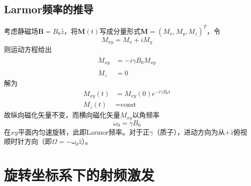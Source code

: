 \documentclass[12pt]{article}
\begin{document}
\subsection{Larmor频率的推导}\label{chap:larmor_freq}
考虑静磁场$\bm{B}=B_0\hat{z}$，将$\bm{M}(t)$写成分量形式$\bm{M}=(M_x,M_y,M_z)^T$，令
\begin{equation}
    M_{xy}=M_x+iM_y
    \label{equ:Mxy_def}
\end{equation}
则运动方程给出
\begin{align}
    \dot{M}_{xy}&=-i\gamma B_0M_{xy} \label{equ:Mxy_equ}\\
    \dot{M}_z&=0
\end{align}
解为
\begin{align}
    M_{xy}(t)&=M_{xy}(0)e^{-i\gamma B_0t} \label{equ:Mxy}\\
    M_z(t)&=\text{const} \label{equ:Mz}
\end{align}
故纵向磁化矢量不变，而横向磁化矢量$M_{xy}$以角频率
\begin{equation}
    \omega_0=\gamma B_0
    \label{equ:larmor_freq}
\end{equation}在$xy$平面内匀速旋转，此即Larmor频率。对于正$\gamma$（质子），进动方向为从$+\hat{z}$俯视顺时针方向（即$\Omega=-\omega_0\hat{z}$）。

\section{旋转坐标系下的射频激发}
\end{document}
